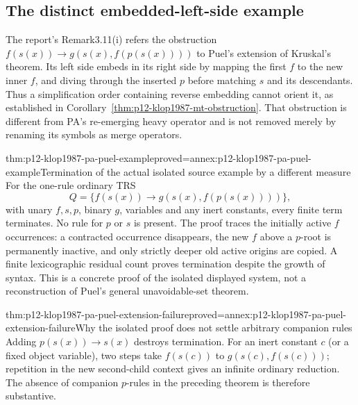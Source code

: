 \subsection{The distinct embedded-left-side example}

The report's Remark3.11(i) refers the obstruction
\(f(s(x))\to g(s(x),f(p(s(x))))\) to Puel's extension of
Kruskal's theorem. Its left side embeds in its right side by mapping
the first \(f\) to the new inner \(f\), and diving through
the inserted \(p\) before matching \(s\) and its descendants.
Thus a simplification order containing reverse embedding cannot
orient it, as established in
Corollary~\ref{thm:p12-klop1987-mt-obstruction}. That obstruction
is different from PA's re-emerging heavy operator and is not removed
merely by renaming its symbols as merge operators.

\begin{hbtheorem}{thm:p12-klop1987-pa-puel-example}{proved=annex:p12-klop1987-pa-puel-example}{Termination of the actual isolated source example by a different measure}
For the one-rule ordinary TRS
\[
 Q=\{f(s(x))\to g(s(x),f(p(s(x))))\},
\]
with unary \(f,s,p\), binary \(g\), variables and any inert
constants, every finite term terminates. No rule for \(p\) or
\(s\) is present. The proof traces the initially active \(f\)
occurrences: a contracted occurrence disappears, the new \(f\)
above a \(p\)-root is permanently inactive, and only strictly
deeper old active origins are copied. A finite lexicographic residual
count proves termination despite the growth of syntax.
This is a concrete proof of the isolated displayed system, not a
reconstruction of Puel's general unavoidable-set theorem.
\end{hbtheorem}

\begin{hblemma}{thm:p12-klop1987-pa-puel-extension-failure}{proved=annex:p12-klop1987-pa-puel-extension-failure}{Why the isolated proof does not settle arbitrary companion rules}
Adding \(p(s(x))\to s(x)\) destroys termination. For an inert
constant \(c\) (or a fixed object variable), two steps take \(f(s(c))\) to
\(g(s(c),f(s(c)))\); repetition in the new second-child context
gives an infinite ordinary reduction. The absence of companion
\(p\)-rules in the preceding theorem is therefore substantive.
\end{hblemma}


